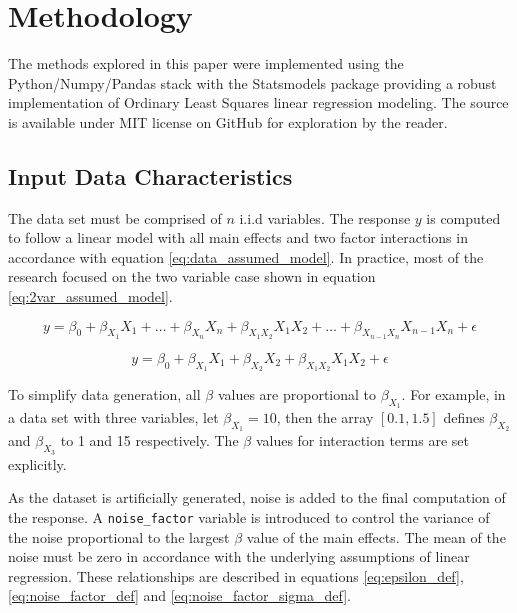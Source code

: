 \documentclass[../paper.tex]{subfiles}
\begin{document}
\section{Methodology}
The methods explored in this paper were implemented using
the Python/Numpy/Pandas stack with the Statsmodels package providing a robust
implementation of Ordinary Least Squares linear regression modeling. The source
is available under MIT license on GitHub for exploration by the reader.


\subsection{Input Data Characteristics}
The data set must be comprised of $n$ i.i.d variables. The response $y$ is computed
to follow a linear model with all main effects and two factor interactions
in accordance with equation \ref{eq:data_assumed_model}. In practice, most of
the research focused on the two variable case shown in equation
\ref{eq:2var_assumed_model}.

\begin{equation}\label{eq:data_assumed_model}
  y = \beta_{0} + \beta_{ X_{1} } X_{1}  + \ldots + \beta_{X_{n}}X_{n} +
  \beta_{X_{1}X_{2}}X_{1}X_{2} + \ldots +\beta_{X_{n-1}X_{n}}X_{n-1}X_{n} + \epsilon
\end{equation}


\begin{equation}\label{eq:2var_assumed_model}
  y = \beta_{0} + \beta_{ X_{1}} X_{1} + \beta_{X_{2} }X_{2} +
  \beta_{ X_{1} X_{2} } X_{1}X_{2} + \epsilon
\end{equation}

To simplify data generation, all $\beta$ values are proportional to $\beta_{X_{1}}$.
For example, in a data set with three variables, let $\beta_{X_{1}} = 10$, then
the array $[0.1, 1.5]$ defines $\beta_{X_{2}}$ and $\beta_{X_{3}}$ to 1 and 15 respectively.
The $\beta$ values for interaction terms are set explicitly.

As the dataset is artificially generated, noise is added to the final
computation of the response. A \texttt{noise_factor} variable is
introduced to control the variance of the noise proportional
to the largest $\beta$ value of the main effects. The mean of the noise must be
zero in accordance with the underlying assumptions of linear regression. These
relationships are described in equations \ref{eq:epsilon_def},
\ref{eq:noise_factor_def} and \ref{eq:noise_factor_sigma_def}.
\end{document}
